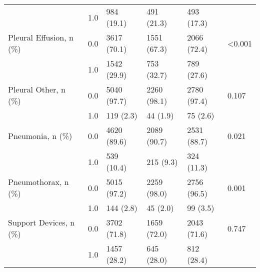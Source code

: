 \begin{tabular}{llllll}
                       & 1.0 &        984 (19.1) &   491 (21.3) &   493 (17.3) &         \\
Pleural Effusion, n (\%) & 0.0 &       3617 (70.1) &  1551 (67.3) &  2066 (72.4) &  <0.001 \\
                       & 1.0 &       1542 (29.9) &   753 (32.7) &   789 (27.6) &         \\
Pleural Other, n (\%) & 0.0 &       5040 (97.7) &  2260 (98.1) &  2780 (97.4) &   0.107 \\
                       & 1.0 &         119 (2.3) &     44 (1.9) &     75 (2.6) &         \\
Pneumonia, n (\%) & 0.0 &       4620 (89.6) &  2089 (90.7) &  2531 (88.7) &   0.021 \\
                       & 1.0 &        539 (10.4) &    215 (9.3) &   324 (11.3) &         \\
Pneumothorax, n (\%) & 0.0 &       5015 (97.2) &  2259 (98.0) &  2756 (96.5) &   0.001 \\
                       & 1.0 &         144 (2.8) &     45 (2.0) &     99 (3.5) &         \\
Support Devices, n (\%) & 0.0 &       3702 (71.8) &  1659 (72.0) &  2043 (71.6) &   0.747 \\
                       & 1.0 &       1457 (28.2) &   645 (28.0) &   812 (28.4) &         \\
\bottomrule
\end{tabular}
